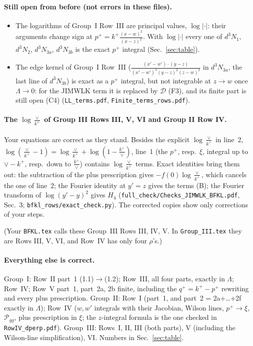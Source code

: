 \documentclass[10pt]{article}
\begin{document}
\paragraph{Still open from before (not errors in these files).}
\begin{itemize}
\item The logarithms of Group~I Row~III are principal values, $\log|\cdot|$: their arguments change sign at $p^+=k^+\frac{(x-w)^2}{(x-z)^2}$. With $\log|\cdot|$ every one of $d^3N_1$, $d^3N_2$, $d^3N_{3a}$, $d^3N_{3b}$ is the exact $p^+$ integral (Sec.~\ref{sec:table}).
\item The edge kernel of Group~I Row~III ($\frac{(x'-w')\cdot(y-z)}{(x'-w')^2(y-z)^2(z-w)^2}$ in $d^3N_{3a}$, the last line of $d^3N_{3b}$) is exact as a $p^+$ integral, but not integrable at $z\to w$ once $\Lambda\to0$: for the JIMWLK term it is replaced by $\mathcal D$ (F3), and its finite part is still open (C4) (\texttt{LL\_terms.pdf}, \texttt{Finite\_terms\_rows.pdf}).
\end{itemize}

\paragraph{The $\log\frac{\vee}{k^+}$ of Group III Rows III, V, VI and Group II Row IV.} Your equations are correct as they stand. Besides the explicit $\log\frac{\vee}{k^+}$ in line~2, $\log(\frac{\vee}{k^+}-1)=\log\frac{\vee}{k^+}+\log(1-\frac{k^+}{\vee})$, line~1 (the $p^+$, resp.\ $\xi$, integral up to $\vee-k^+$, resp.\ down to $\frac{k^+}{\vee}$) contains $\log\frac{\vee}{k^+}$ terms. Exact identities bring them out: the subtraction of the plus prescription gives $-f(0)\log\frac{\vee}{k^+}$, which cancels the one of line~2; the Fourier identity at $y'=z$ gives the terms (B); the Fourier transform of $\log(y'-y)^2$ gives $H_4$ (\texttt{full\_check/Checks\_JIMWLK\_BFKL.pdf}, Sec.~3; \texttt{bfkl\_rows/exact\_check.py}). The corrected copies show only corrections of your steps.

(Your \texttt{BFKL.tex} calls these Group~III Rows III, IV, V. In \texttt{Group\_III.tex} they are Rows III, V, VI, and Row~IV has only four $\rho$'s.)

\paragraph{Everything else is correct.} Group~I: Row~II part~1 (1.1)$\to$(1.2); Row~III, all four parts, exactly in $\Lambda$; Row~IV; Row~V part~1, part~2a, 2b finite, including the $q^+=k^+-p^+$ rewriting and every plus prescription. Group~II: Row~I (part~1, and part~2 = 2a+\dots+2f exactly in $\Lambda$); Row~IV ($w,w'$ integrals with their Jacobian, Wilson lines, $p^+\to\xi$, $\mathcal P_{gg}$, plus prescription in $\xi$; the $z$-integral formula is the one checked in \texttt{RowIV\_dperp.pdf}). Group~III: Rows~I, II, III (both parts), V (including the Wilson-line simplification), VI. Numbers in Sec.~\ref{sec:table}.
\end{document}
